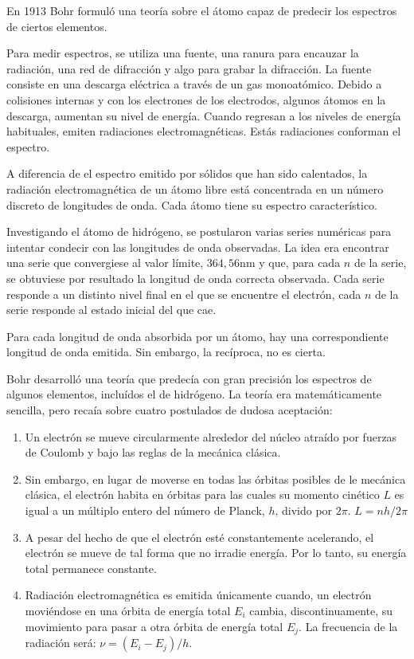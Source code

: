 \documentclass{article}
\begin{document}
En 1913 Bohr formuló una teoría sobre el átomo capaz de predecir los espectros de ciertos elementos.

Para medir espectros, se utiliza una fuente, una ranura para encauzar la radiación, una red de difracción y algo para grabar la difracción. La fuente consiste en una descarga eléctrica a través de un gas monoatómico. Debido a colisiones internas  y con los electrones de los electrodos, algunos átomos en la descarga, aumentan su nivel de energía. Cuando regresan a los niveles de energía habituales, emiten radiaciones electromagnéticas. Estás radiaciones conforman el espectro.

A diferencia de el espectro emitido por sólidos que han sido calentados, la radiación electromagnética de un átomo libre está concentrada en un número discreto de longitudes de onda. Cada átomo tiene su espectro característico.

Investigando el átomo de hidrógeno, se postularon varias series numéricas para intentar condecir con las longitudes de onda observadas. La idea era encontrar una serie que convergiese al valor límite, $364,56\textrm{nm}$ y que, para cada $n$ de la serie, se obtuviese por resultado la longitud de onda correcta observada. Cada serie responde a un distinto nivel final en el que se encuentre el electrón, cada $n$ de la serie responde al estado inicial del que cae.

Para cada longitud de onda absorbida por un átomo, hay una correspondiente longitud de onda emitida. Sin embargo, la recíproca, no es cierta.

Bohr desarrolló una teoría que predecía con gran precisión los espectros de algunos elementos, incluídos el de hidrógeno. La teoría era matemáticamente sencilla, pero recaía sobre cuatro postulados de dudosa aceptación:
\begin{enumerate}
\item Un electrón se mueve circularmente alrededor del núcleo atraído por fuerzas de Coulomb y bajo las reglas de la mecánica clásica.
\item Sin embargo, en lugar de moverse en todas las órbitas posibles de le mecánica clásica, el electrón habita en órbitas para las cuales su momento cinético $L$ es igual a un múltiplo entero del número de Planck, $h$, divido por $2\pi$. $L=nh/2\pi$
\item A pesar del hecho de que el electrón esté constantemente acelerando, el electrón se mueve de tal forma que no irradie energía. Por lo tanto, su energía total permanece constante.
\item Radiación electromagnética es emitida únicamente cuando, un electrón moviéndose en una órbita de energía total $E_{i}$ cambia, discontinuamente, su movimiento para pasar a otra órbita de energía total $E_{j}$. La frecuencia de la radiación será: $\nu=(E_{i}-E_{j})/h$.
\end{enumerate}
\end{document}
